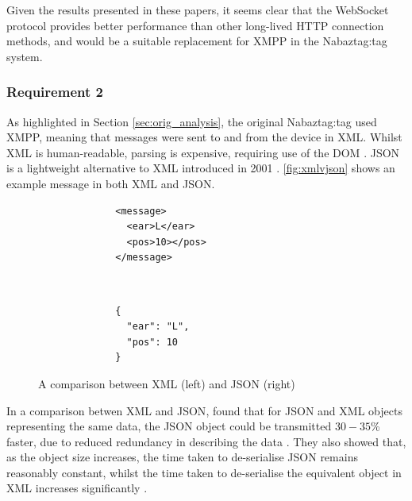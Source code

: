 \documentclass[12pt, a4paper]{article}
\begin{document}
Given the results presented in these papers, it seems clear that the WebSocket protocol provides better performance than other long-lived \ac{HTTP} connection methods, and would be a suitable replacement for \ac{XMPP} in the Nabaztag:tag system.

\subsubsection{Requirement 2}
As highlighted in Section \ref{sec:orig_analysis}, the original Nabaztag:tag used \ac{XMPP}, meaning that messages were sent to and from the device in \ac{XML}. Whilst \ac{XML} is human-readable, parsing is expensive, requiring use of the \ac{DOM} \parencite{Lin2012}. \ac{JSON} \parencite{json} is a lightweight alternative to \ac{XML} introduced in 2001 \parencite{Severance2012}. \autoref{fig:xmlvjson} shows an example message in both \ac{XML} and \ac{JSON}.

	\begin{figure}[H]
		\centering
		\begin{subfigure}{0.27\textwidth}
		\centering
		\begin{verbatim}
		<message>
		  <ear>L</ear>
		  <pos>10></pos>
		</message>
		\end{verbatim}
		\end{subfigure}
		~~~~~~~~~~~~~~~
		\begin{subfigure}{0.23\textwidth}
		\centering
		\begin{verbatim}
		{
		  "ear": "L",
		  "pos": 10
		}
		\end{verbatim}
		\end{subfigure}
		\caption[A comparison between \acs{XML} and \acs{JSON}]{A comparison between \ac{XML} (left) and \ac{JSON} (right)}
		\label{fig:xmlvjson}
	\end{figure}
	
	\vspace{-15pt}

In a comparison betwen \ac{XML} and \ac{JSON}, \citeauthor{Lin2012} found that for \ac{JSON} and \ac{XML} objects representing the same data, the \ac{JSON} object could be transmitted $30 - 35$\% faster, due to reduced redundancy in describing the data \parencite{Lin2012}. They also showed that, as the object size increases, the time taken to de-serialise \ac{JSON} remains reasonably constant, whilst the time taken to de-serialise the equivalent object in \ac{XML} increases significantly \parencite{Lin2012}.
\end{document}
